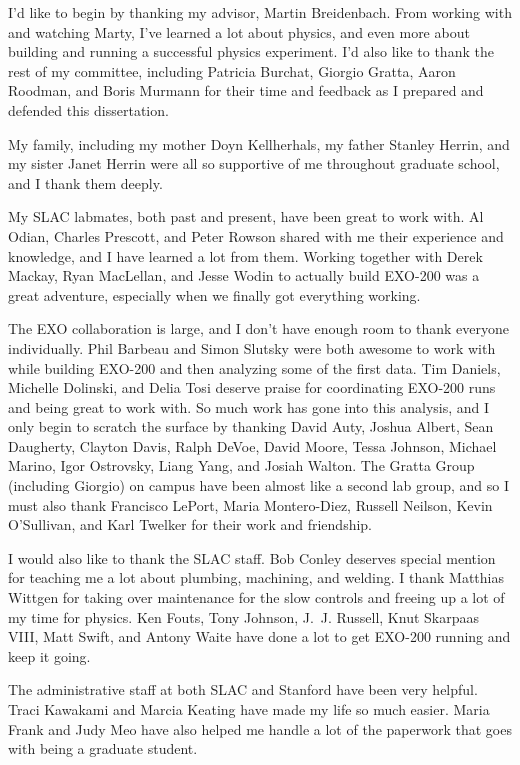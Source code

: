 I'd like to begin by thanking my advisor, Martin Breidenbach. From working with and watching Marty, I've learned a lot about physics, and even more about building and running a successful physics experiment. I'd also like to thank the rest of my committee, including Patricia Burchat, Giorgio Gratta, Aaron Roodman, and Boris Murmann for their time and feedback as I prepared and defended this dissertation.

My family, including my mother Doyn Kellherhals, my father Stanley Herrin, and my sister Janet Herrin were all so supportive of me throughout graduate school, and I thank them deeply. 

My SLAC labmates, both past and present, have been great to work with. Al Odian, Charles Prescott, and Peter Rowson shared with me their experience and knowledge, and I have learned a lot from them. Working together with Derek Mackay, Ryan MacLellan, and Jesse Wodin to actually build EXO-200 was a great adventure, especially when we finally got everything working.

The EXO collaboration is large, and I don't have enough room to thank everyone individually. Phil Barbeau and Simon Slutsky were both awesome to work with while building EXO-200 and then analyzing some of the first data. Tim Daniels, Michelle Dolinski, and Delia Tosi deserve praise for coordinating EXO-200 runs and being great to work with. So much work has gone into this analysis, and I only begin to scratch the surface by thanking David Auty, Joshua Albert, Sean Daugherty, Clayton Davis, Ralph DeVoe, David Moore, Tessa Johnson, Michael Marino, Igor Ostrovsky, Liang Yang, and Josiah Walton. The Gratta Group (including Giorgio) on campus have been almost like a second lab group, and so I must also thank Francisco LePort, Maria Montero-Diez, Russell Neilson, Kevin O'Sullivan, and Karl Twelker for their work and friendship.

I would also like to thank the SLAC staff. Bob Conley deserves special mention for teaching me a lot about plumbing, machining, and welding. I thank Matthias Wittgen for taking over maintenance for the slow controls and freeing up a lot of my time for physics. Ken Fouts, Tony Johnson, J.~J. Russell, Knut Skarpaas VIII, Matt Swift, and Antony Waite have done a lot to get EXO-200 running and keep it going.

The administrative staff at both SLAC and Stanford have been very helpful. Traci Kawakami and Marcia Keating have made my life so much easier. Maria Frank and Judy Meo have also helped me handle a lot of the paperwork that goes with being a graduate student.

